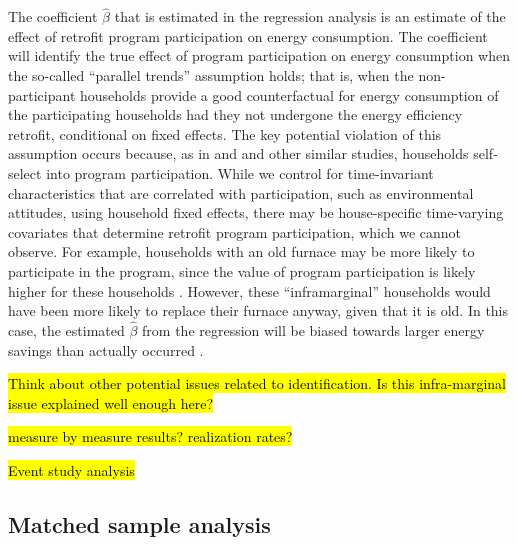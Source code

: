 \documentclass{article}
\newcommand{\hlc}[2][yellow]{ {\sethlcolor{#1} \hl{#2}} }
\begin{document}
The coefficient $\hat{\beta}$ that is estimated in the regression analysis is an estimate of the effect of retrofit program participation on energy consumption. The coefficient will identify the true effect of program participation on energy consumption when the so-called ``parallel trends'' assumption holds; that is, when the non-participant households provide a good counterfactual for energy consumption of the participating households had they not undergone the energy efficiency retrofit, conditional on fixed effects. The key potential violation of this assumption occurs because, as in \cite{liang2018energy} and \cite{chuang2022residential} and other similar studies, households self-select into program participation. While we control for time-invariant characteristics that are correlated with participation, such as environmental attitudes, using household fixed effects, there may be house-specific time-varying covariates that determine retrofit program participation, which we cannot observe. For example, households with an old furnace may be more likely to participate in the program, since the value of program participation is likely higher for these households \citep{rivers2016free}. However, these ``inframarginal'' households would have been more likely to replace their furnace anyway, given that it is old. In this case, the estimated $\hat{\beta}$ from the regression will be biased towards larger energy savings than actually occurred \citep{boomhower2014credible}.

\hlc{Think about other potential issues related to identification. Is this infra-marginal issue explained well enough here?}

\hlc{measure by measure results? realization rates?}

\hlc{Event study analysis}

\subsection{Matched sample analysis}\label{sec:match}
\end{document}
